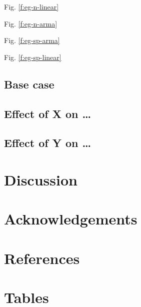 Fig. \ref{f:eg-n-linear}

Fig. \ref{f:eg-n-arma}

Fig. \ref{f:eg-sp-arma}

Fig. \ref{f:eg-sp-linear}

\subsection{Base case}

\subsection{Effect of X on \ldots{}}

\subsection{Effect of Y on \ldots{}}

\section{Discussion}

\section{Acknowledgements}

\section{References}





\clearpage

\section{Tables}

